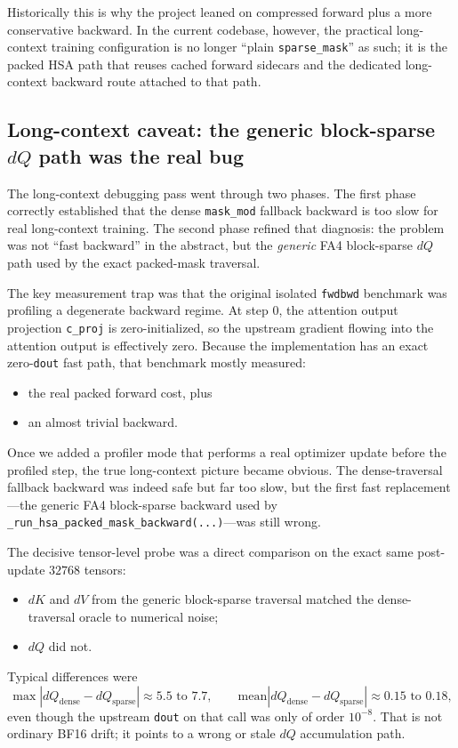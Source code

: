 \documentclass[11pt]{article}
\begin{document}
Historically this is why the project leaned on compressed forward plus a more
conservative backward. In the current codebase, however, the practical
long-context training configuration is no longer ``plain
\texttt{sparse\_mask}'' as such; it is the packed HSA path that reuses cached
forward sidecars and the dedicated long-context backward route attached to that
path.

\subsection{Long-context caveat: the generic block-sparse \texorpdfstring{$dQ$}{dQ} path was the real bug}

The long-context debugging pass went through two phases. The first phase
correctly established that the dense \texttt{mask\_mod} fallback backward is too
slow for real long-context training. The second phase refined that diagnosis:
the problem was not ``fast backward'' in the abstract, but the \emph{generic}
FA4 block-sparse $dQ$ path used by the exact packed-mask traversal.

The key measurement trap was that the original isolated \texttt{fwdbwd}
benchmark was profiling a degenerate backward regime. At step $0$, the
attention output projection \texttt{c\_proj} is zero-initialized, so the
upstream gradient flowing into the attention output is effectively zero. Because
the implementation has an exact zero-\texttt{dout} fast path, that benchmark
mostly measured:
\begin{itemize}[leftmargin=1.5em]
    \item the real packed forward cost, plus
    \item an almost trivial backward.
\end{itemize}

Once we added a profiler mode that performs a real optimizer update before the
profiled step, the true long-context picture became obvious. The dense-traversal
fallback backward was indeed safe but far too slow, but the first fast
replacement---the generic FA4 block-sparse backward used by
\texttt{\_run\_hsa\_packed\_mask\_backward(...)}---was still wrong.

The decisive tensor-level probe was a direct comparison on the exact same
post-update $32768$ tensors:
\begin{itemize}[leftmargin=1.5em]
    \item $dK$ and $dV$ from the generic block-sparse traversal matched the
    dense-traversal oracle to numerical noise;
    \item $dQ$ did not.
\end{itemize}
Typical differences were
\[
\max|dQ_{\mathrm{dense}} - dQ_{\mathrm{sparse}}| \approx 5.5 \text{ to } 7.7,
\qquad
\mathrm{mean}|dQ_{\mathrm{dense}} - dQ_{\mathrm{sparse}}| \approx 0.15 \text{ to } 0.18,
\]
even though the upstream \texttt{dout} on that call was only of order
$10^{-8}$. That is not ordinary BF16 drift; it points to a wrong or stale
$dQ$ accumulation path.
\end{document}
